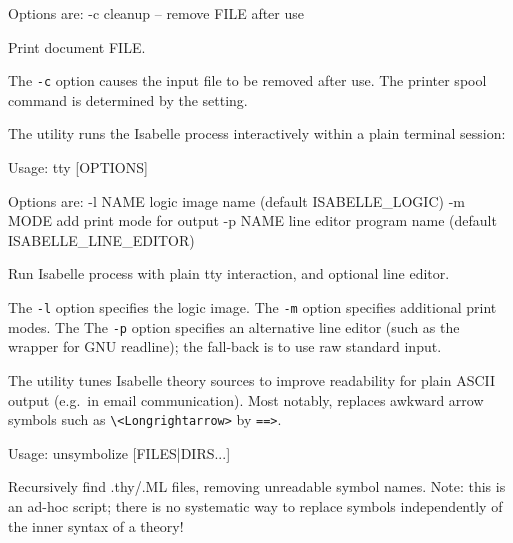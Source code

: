 \begin{isabellebody}
\begin{isamarkuptext}
\begin{ttbox}
  Options are:
    -c           cleanup -- remove FILE after use

  Print document FILE.
\end{ttbox}

  The \verb|-c| option causes the input file to be removed
  after use.  The printer spool command is determined by the \hyperlink{setting.PRINT-COMMAND}{\mbox{}} setting.%
\end{isamarkuptext}%
\isamarkuptrue%
%
\isamarkuptrue%
%
\begin{isamarkuptext}%
The \hypertarget{tool.tty}{\hyperlink{tool.tty}{\mbox{}}} utility runs the Isabelle process interactively
  within a plain terminal session:
\begin{ttbox}
Usage: tty [OPTIONS]

  Options are:
    -l NAME      logic image name (default ISABELLE_LOGIC)
    -m MODE      add print mode for output
    -p NAME      line editor program name (default ISABELLE_LINE_EDITOR)

  Run Isabelle process with plain tty interaction, and optional line editor.
\end{ttbox}

  The \verb|-l| option specifies the logic image.  The
  \verb|-m| option specifies additional print modes.  The The
  \verb|-p| option specifies an alternative line editor (such
  as the \hypertarget{executable.rlwrap}{\hyperlink{executable.rlwrap}{\mbox{}}} wrapper for GNU readline); the
  fall-back is to use raw standard input.%
\end{isamarkuptext}%
\isamarkuptrue%
%
\isamarkuptrue%
%
\begin{isamarkuptext}%
The \hypertarget{tool.unsymbolize}{\hyperlink{tool.unsymbolize}{\mbox{}}} utility tunes Isabelle theory sources to
  improve readability for plain ASCII output (e.g.\ in email
  communication).  Most notably, \hyperlink{tool.unsymbolize}{\mbox{}} replaces awkward
  arrow symbols such as \verb|\|\verb|<Longrightarrow>|
  by \verb|==>|.
\begin{ttbox}
Usage: unsymbolize [FILES|DIRS...]

  Recursively find .thy/.ML files, removing unreadable symbol names.
  Note: this is an ad-hoc script; there is no systematic way to replace
  symbols independently of the inner syntax of a theory!


\end{ttbox}
\end{isamarkuptext}
\end{isabellebody}

